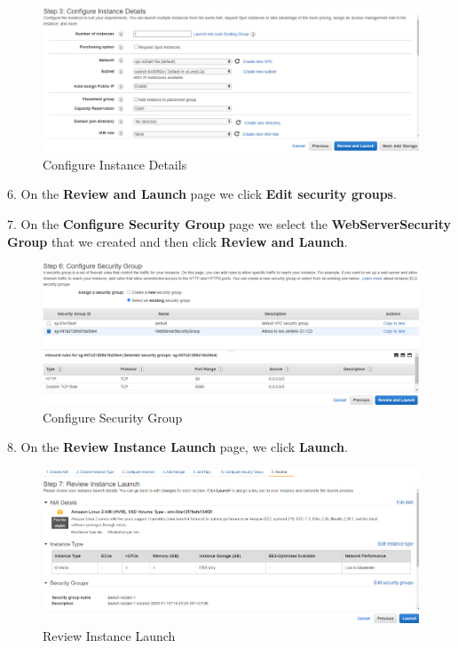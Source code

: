 \documentclass[12pt,a4paper,twoside]{article}
\begin{document}
\begin{figure}[H]
    \centering
        \includegraphics[width=15cm]{images-aws/7-config-instance-details.png}
        \caption{Configure Instance Details}
\end{figure}


6. On the \textbf{Review and Launch} page we click \textbf{Edit security groups}.


7. On the \textbf{Configure Security Group} page we select the \textbf{WebServerSecurity Group} that we created and then click \textbf{Review and Launch}.


\begin{figure}[H]
    \centering
        \includegraphics[width=15cm]{images-aws/8-config-sec-group.png}
        \caption{Configure Security Group}
\end{figure}


8. On the \textbf{Review Instance Launch} page, we click \textbf{Launch}.


\begin{figure}[H]
    \centering
        \includegraphics[width=15cm]{images-aws/9-review-instance-launch.png}
        \caption{Review Instance Launch}
\end{figure}
\end{document}
